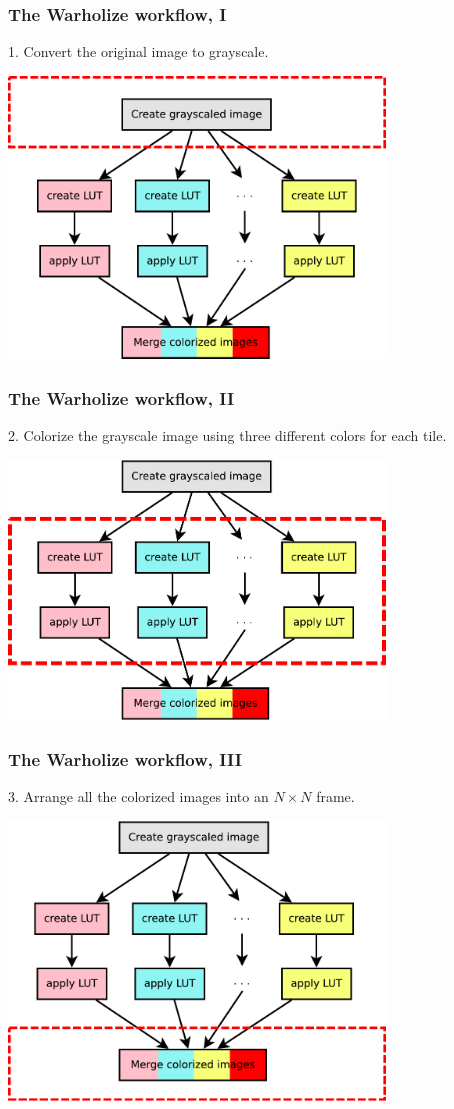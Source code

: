 \documentclass[english,serif,mathserif,xcolor=pdftex,dvipsnames,table]{beamer}
\begin{document}
\begin{frame}
  \frametitle{The Warholize workflow, I}

  1. Convert the original image to grayscale.

  \+
  \includegraphics[width=0.75\textwidth]{fig/warholize-wkf1}
\end{frame}


\begin{frame}
  \frametitle{The Warholize workflow, II}

  2. Colorize the grayscale image using three different colors for each tile.

  \+
  \includegraphics[width=0.75\textwidth]{fig/warholize-wkf2}
\end{frame}


\begin{frame}
  \frametitle{The Warholize workflow, III}

  3. Arrange all the colorized images into an $N\times N$ frame.

  \+
  \includegraphics[width=0.75\textwidth]{fig/warholize-wkf3}
\end{frame}
\end{document}
